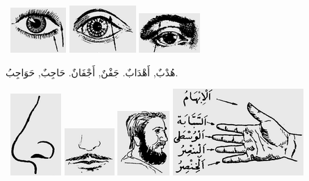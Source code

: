 \documentclass[a5paper]{article}
\begin{document}
\  \includegraphics[width=0.8335in,height=0.6772in]{images/MuhammadBagauddinprettified-img259.png}   \includegraphics[width=1in,height=0.7083in]{images/MuhammadBagauddinprettified-img260.png}   \includegraphics[width=0.9165in,height=0.5937in]{images/MuhammadBagauddinprettified-img261.png} 

هُدْبٌ, أَهْدَابٌ. جَفْنٌ, أَجْفَانٌ. حَاجِبٌ, حَوَاجِبُ.

\  \includegraphics[width=0.7602in,height=1.2291in]{images/MuhammadBagauddinprettified-img262.png}   \includegraphics[width=0.75in,height=0.7083in]{images/MuhammadBagauddinprettified-img263.png}   \includegraphics[width=0.7811in,height=0.9689in]{images/MuhammadBagauddinprettified-img264.png}   \includegraphics[width=1.9583in,height=1.302in]{images/MuhammadBagauddinprettified-img265.png} 
\end{document}
